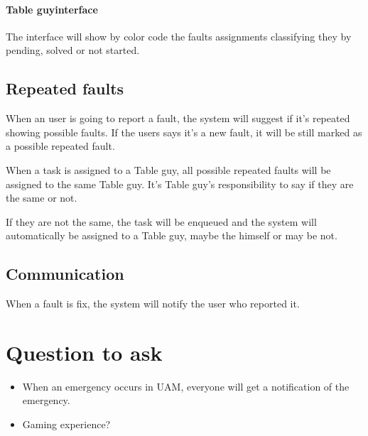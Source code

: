 \documentclass[nobuilddate,nochap]{apuntes}
\newcommand{\tbg}{Table guy}
\begin{document}
\paragraph{\tbg interface}
The interface will show by color code the faults assignments classifying  they by pending, solved or not started.


\subsection{Repeated faults}
When an user is going to report a fault, the system will suggest if it's repeated showing possible faults. If the users says it's a new fault, it will be still marked as a possible repeated fault.

When a task is assigned to a \tbg, all possible repeated faults will be assigned to the same \tbg. It's \tbg's responsibility to say if they are the same or not.

If they are not the same, the task will be enqueued and the system will automatically be assigned to a \tbg, maybe the himself or may be not.


\subsection{Communication}

When a fault is fix, the system will notify the user who reported it.

\section{Question to ask}

\begin{itemize}
\item When an emergency occurs in UAM, everyone will get a notification  of the emergency. 
\item Gaming experience?

\end{itemize}


 
\end{document}

